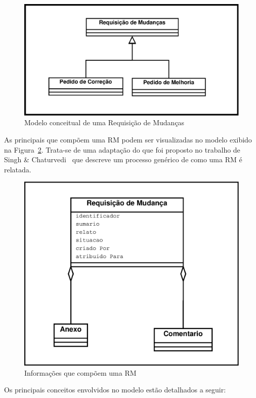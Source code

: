 \begin{figure}[htpb]
	\centering
	\includegraphics[width=0.8\linewidth]{./chapter-manutencao-software-visao-geral/img/diagrama-classe-conceitual-requisicao-mudancas.pdf}
	\caption{Modelo conceitual de uma Requisição de Mudanças}
\label{fig:diagrama-classe-requisicao-mudancas}
\end{figure}

As principais que compõem uma RM podem ser visualizadas no modelo exibido na
Figura~\ref{fig:diagrama-classe-atributos-requisicao-mudancas}. Trata-se de uma
adaptação do que foi proposto no trabalho de Singh \&
Chaturvedi~\cite{singh2011bug} que descreve um processo genérico de como uma RM
é relatada.

\begin{figure}[htpb]
	\centering
	\includegraphics[width=0.8\linewidth]{./chapter-manutencao-software-visao-geral/img/diagrama-classe-atributos-requisicao-mudancas.pdf}
	\caption{Informações que compõem uma RM}
\label{fig:diagrama-classe-atributos-requisicao-mudancas}
\end{figure}

Os principais conceitos envolvidos no modelo estão detalhados a seguir:


